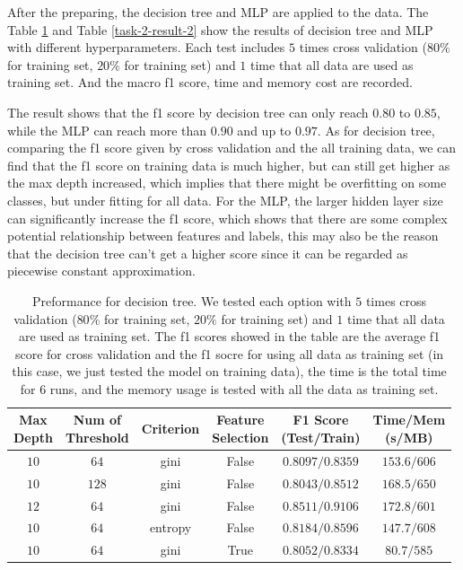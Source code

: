 \documentclass[11pt]{article}
\begin{document}
After the preparing, the decision tree and MLP are applied to the data. The Table \ref{task-2-result-1} and Table \ref{task-2-result-2} show the results of decision tree and MLP with different hyperparameters. Each test includes $5$ times cross validation ($80\%$ for training set, $20\%$ for training set) and $1$ time that all data are used as training set. And the macro f1 score, time and memory cost are recorded.

The result shows that the f1 score by decision tree can only reach $0.80$ to $0.85$, while the MLP can reach more than $0.90$ and up to $0.97$. As for decision tree, comparing the f1 score given by cross validation and the all training data, we can find that the f1 score on training data is much higher, but can still get higher as the max depth increased, which implies that there might be overfitting on some classes, but under fitting for all data. For the MLP, the larger hidden layer size can significantly increase the f1 score, which shows that there are some complex potential relationship between features and labels, this may also be the reason that the decision tree can't get a higher score since it can be regarded as piecewise constant approximation.

\begin{table}[H]
  \centering
  \begin{tabular}{|c|c|c|c|c|c|}
    \hline
    \makecell{Max                                                  \\Depth} & \makecell{Num of                                                          \\ Threshold} & Criterion & \makecell{Feature \\ Selection}& \makecell{F1 Score \\ (Test/Train)} & \makecell{Time/Mem \\ (s/MB)}               \\
    \hline
    $10$ & $64$  & gini    & False & $0.8097/0.8359$ & $153.6/606$ \\
    \hline
    $10$ & $128$ & gini    & False & $0.8043/0.8512$ & $168.5/650$ \\
    \hline
    $12$ & $64$  & gini    & False & $0.8511/0.9106$ & $172.8/601$ \\
    \hline
    $10$ & $64$  & entropy & False & $0.8184/0.8596$ & $147.7/608$ \\
    \hline
    $10$ & $64$  & gini    & True  & $0.8052/0.8334$ & $80.7/585$  \\
    \hline
  \end{tabular}
  \caption{Preformance for decision tree. We tested each option with $5$ times cross validation ($80\%$ for training set, $20\%$ for training set) and $1$ time that all data are used as training set. The f1 scores showed in the table are the average f1 score for cross validation and the f1 socre for using all data as training set (in this case, we just tested the model on training data), the time is the total time for $6$ runs, and the memory usage is tested with all the data as training set.}
  \label{task-2-result-1}
\end{table}
\end{document}
